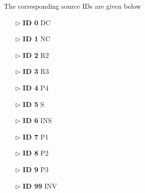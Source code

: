 The corresponding source IDs are given below
\begin{enumerate}
	\item [$\rhd$] \textbf{ID 0} DC
	\item [$\rhd$] \textbf{ID 1} NC
	\item [$\rhd$] \textbf{ID 2} R2
	\item [$\rhd$] \textbf{ID 3} R3
	\item [$\rhd$] \textbf{ID 4} P4
	\item [$\rhd$] \textbf{ID 5} S
	\item [$\rhd$] \textbf{ID 6} INS
	\item [$\rhd$] \textbf{ID 7} P1
	\item [$\rhd$] \textbf{ID 8} P2
	\item [$\rhd$] \textbf{ID 9} P3
	\item [$\rhd$] \textbf{ID 99} INV
\end{enumerate}




